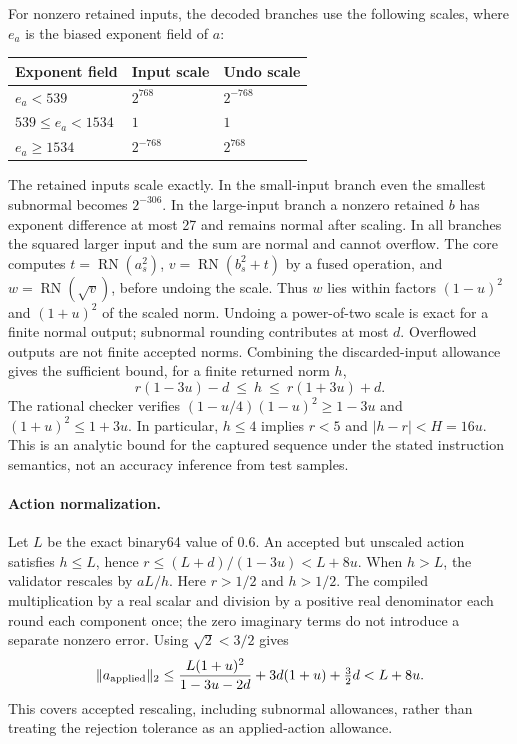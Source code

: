 For nonzero retained inputs, the decoded branches use the following
scales, where $e_a$ is the biased exponent field of $a$:
\begin{center}
\begin{tabular}{@{}lll@{}}
\toprule
Exponent field & Input scale & Undo scale\\
\midrule
$e_a<539$ & $2^{768}$ & $2^{-768}$\\
$539\leq e_a<1534$ & $1$ & $1$\\
$e_a\geq1534$ & $2^{-768}$ & $2^{768}$\\
\bottomrule
\end{tabular}
\end{center}
The retained inputs scale exactly. In the small-input branch even the
smallest subnormal becomes $2^{-306}$. In the large-input branch a
nonzero retained $b$ has exponent difference at most 27 and remains
normal after scaling. In all branches the squared larger input and
the sum are normal and cannot overflow. The core computes
$t=\operatorname{RN}(a_s^2)$,
$v=\operatorname{RN}(b_s^2+t)$ by a fused operation, and
$w=\operatorname{RN}(\sqrt v)$, before undoing the scale.
Thus $w$ lies within factors $(1-u)^2$ and $(1+u)^2$ of the scaled norm.
Undoing a power-of-two scale is exact for a finite normal output;
subnormal rounding contributes at most $d$. Overflowed outputs are not
finite accepted norms. Combining the discarded-input allowance gives
the sufficient bound, for a finite returned norm $h$,
\begin{equation}
 r(1-3u)-d\ \leq\ h\ \leq\ r(1+3u)+d.
 \label{eq:hypot-bound}
\end{equation}
The rational checker verifies
$(1-u/4)(1-u)^2\geq1-3u$ and $(1+u)^2\leq1+3u$.
In particular, $h\leq4$ implies $r<5$ and
$|h-r|<H=16u$. This is an analytic bound for the captured sequence
under the stated instruction semantics, not an accuracy inference from
test samples.

\paragraph{Action normalization.}
Let $L$ be the exact binary64 value of $0.6$. An accepted but unscaled
action satisfies $h\leq L$, hence
$r\leq(L+d)/(1-3u)<L+8u$. When $h>L$, the validator rescales by
$aL/h$. Here $r>1/2$ and $h>1/2$. The compiled multiplication by a real
scalar and division by a positive real denominator each round each
component once; the zero imaginary terms do not introduce a separate
nonzero error. Using $\sqrt2<3/2$ gives
\begin{equation}
 \|a_{\rm applied}\|_2
 \leq \frac{L(1+u)^2}{1-3u-2d}
       +3d(1+u)+\tfrac32 d
 < L+8u.
 \label{eq:action-bound}
\end{equation}
This covers accepted rescaling, including subnormal allowances, rather
than treating the rejection tolerance as an applied-action allowance.

